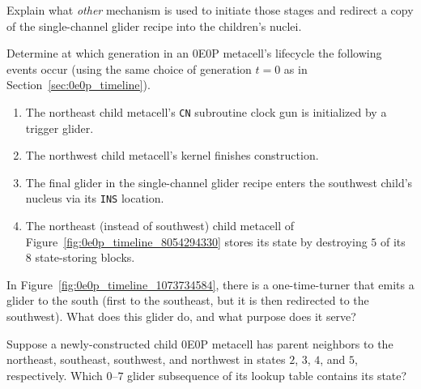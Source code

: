 \begin{multicols}{2}
\begin{problem}
		\noindent Explain what \emph{other} mechanism is used to initiate those stages and redirect a copy of the single-channel glider recipe into the children's nuclei.
	\end{problem}


	\mfilbreak
	
	
	\begin{problem}\label{exer:0e0p_clock_gun_find_timestamps} 
		Determine at which generation in an 0E0P metacell's lifecycle the following events occur (using the same choice of generation $t = 0$ as in Section~\ref{sec:0e0p_timeline}).\smallskip
		
		\begin{enumerate}[label=\bf\color{ocre}(\alph*)]
			\item The northeast child metacell's \texttt{CN} subroutine clock gun is initialized by a trigger glider.
			
			\item The northwest child metacell's kernel finishes construction.
			
			\item The final glider in the single-channel glider recipe enters the southwest child's nucleus via its \texttt{INS} location.
			
			\item The northeast (instead of southwest) child metacell of Figure~\ref{fig:0e0p_timeline_8054294330} stores its state by destroying $5$ of its $8$ state-storing blocks.
		\end{enumerate}
	\end{problem}


	\mfilbreak
	
	
	\begin{problemstar}\label{exer:0e0p_extra_south_glider} 
		In Figure~\ref{fig:0e0p_timeline_1073734584}, there is a one-time-turner that emits a glider to the south (first to the southeast, but it is then redirected to the southwest). What does this glider do, and what purpose does it serve?
	\end{problemstar}


	\mfilbreak


	\begin{problemstar}\label{exer:0e0p_which_lookup_subsequence} 
		Suppose a newly-constructed child 0E0P metacell has parent neighbors to the northeast, southeast, southwest, and northwest in states $2$, $3$, $4$, and $5$, respectively. Which $0$--$7$ glider subsequence of its lookup table contains its state?
	\end{problemstar}



\end{multicols}

